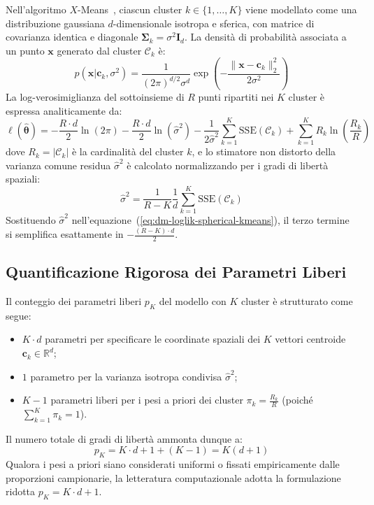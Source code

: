 Nell'algoritmo $X$-Means~\cite{pelleg2000}, ciascun cluster $k \in \{1, \dots, K\}$ viene modellato come una distribuzione gaussiana $d$-dimensionale isotropa e sferica, con matrice di covarianza identica e diagonale $\boldsymbol{\Sigma}_k = \sigma^2 \mathbf{I}_d$. La densità di probabilità associata a un punto $\mathbf{x}$ generato dal cluster $\mathcal{C}_k$ è:
\begin{equation}
\label{eq:dm-spherical-gaussian-pdf}
p(\mathbf{x} | \mathbf{c}_k, \sigma^2) = \frac{1}{(2\pi)^{d/2} \sigma^d} \exp\left( -\frac{\|\mathbf{x} - \mathbf{c}_k\|_2^2}{2\sigma^2} \right)
\end{equation}
La log-verosimiglianza del sottoinsieme di $R$ punti ripartiti nei $K$ cluster è espressa analiticamente da:
\begin{equation}
\label{eq:dm-loglik-spherical-kmeans}
\ell(\hat{\boldsymbol{\theta}}) = -\frac{R \cdot d}{2} \ln(2\pi) - \frac{R \cdot d}{2} \ln(\hat{\sigma}^2) - \frac{1}{2\hat{\sigma}^2} \sum_{k=1}^K \mathrm{SSE}(\mathcal{C}_k) + \sum_{k=1}^K R_k \ln\left(\frac{R_k}{R}\right)
\end{equation}
dove $R_k = |\mathcal{C}_k|$ è la cardinalità del cluster $k$, e lo stimatore non distorto della varianza comune residua $\hat{\sigma}^2$ è calcolato normalizzando per i gradi di libertà spaziali:
\begin{equation}
\label{eq:dm-sigma-sq-unbiased}
\hat{\sigma}^2 = \frac{1}{R - K} \frac{1}{d} \sum_{k=1}^K \mathrm{SSE}(\mathcal{C}_k)
\end{equation}
Sostituendo $\hat{\sigma}^2$ nell'equazione~(\ref{eq:dm-loglik-spherical-kmeans}), il terzo termine si semplifica esattamente in $-\frac{(R - K) \cdot d}{2}$.

\subsection{Quantificazione Rigorosa dei Parametri Liberi}

Il conteggio dei parametri liberi $p_K$ del modello con $K$ cluster è strutturato come segue:
\begin{itemize}
    \item $K \cdot d$ parametri per specificare le coordinate spaziali dei $K$ vettori centroide $\mathbf{c}_k \in \mathbb{R}^d$;
    \item $1$ parametro per la varianza isotropa condivisa $\hat{\sigma}^2$;
    \item $K - 1$ parametri liberi per i pesi a priori dei cluster $\pi_k = \frac{R_k}{R}$ (poiché $\sum_{k=1}^K \pi_k = 1$).
\end{itemize}
Il numero totale di gradi di libertà ammonta dunque a:
\begin{equation}
\label{eq:dm-pk-spherical-count}
p_K = K \cdot d + 1 + (K - 1) = K(d + 1)
\end{equation}
Qualora i pesi a priori siano considerati uniformi o fissati empiricamente dalle proporzioni campionarie, la letteratura computazionale adotta la formulazione ridotta $p_K = K \cdot d + 1$.

